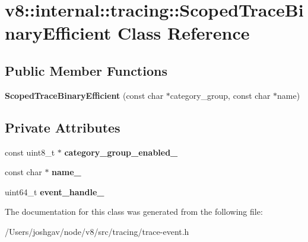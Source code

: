 \hypertarget{classv8_1_1internal_1_1tracing_1_1_scoped_trace_binary_efficient}{}\section{v8\+:\+:internal\+:\+:tracing\+:\+:Scoped\+Trace\+Binary\+Efficient Class Reference}
\label{classv8_1_1internal_1_1tracing_1_1_scoped_trace_binary_efficient}
\subsection*{Public Member Functions}
\begin{DoxyCompactItemize}
\item 
{\bfseries Scoped\+Trace\+Binary\+Efficient} (const char $\ast$category\+\_\+group, const char $\ast$name)\hypertarget{classv8_1_1internal_1_1tracing_1_1_scoped_trace_binary_efficient_ac738a1ed720b13f389b1e1b5e6299b66}{}\label{classv8_1_1internal_1_1tracing_1_1_scoped_trace_binary_efficient_ac738a1ed720b13f389b1e1b5e6299b66}

\end{DoxyCompactItemize}
\subsection*{Private Attributes}
\begin{DoxyCompactItemize}
\item 
const uint8\+\_\+t $\ast$ {\bfseries category\+\_\+group\+\_\+enabled\+\_\+}\hypertarget{classv8_1_1internal_1_1tracing_1_1_scoped_trace_binary_efficient_a85171cb21d4e9cab63af2299f1993cf7}{}\label{classv8_1_1internal_1_1tracing_1_1_scoped_trace_binary_efficient_a85171cb21d4e9cab63af2299f1993cf7}

\item 
const char $\ast$ {\bfseries name\+\_\+}\hypertarget{classv8_1_1internal_1_1tracing_1_1_scoped_trace_binary_efficient_aafbcf20d02210508fad6d512d0708418}{}\label{classv8_1_1internal_1_1tracing_1_1_scoped_trace_binary_efficient_aafbcf20d02210508fad6d512d0708418}

\item 
uint64\+\_\+t {\bfseries event\+\_\+handle\+\_\+}\hypertarget{classv8_1_1internal_1_1tracing_1_1_scoped_trace_binary_efficient_a0578cd40912f22d990fc8d174c2f331f}{}\label{classv8_1_1internal_1_1tracing_1_1_scoped_trace_binary_efficient_a0578cd40912f22d990fc8d174c2f331f}

\end{DoxyCompactItemize}


The documentation for this class was generated from the following file\+:\begin{DoxyCompactItemize}
\item 
/\+Users/joshgav/node/v8/src/tracing/trace-\/event.\+h\end{DoxyCompactItemize}
